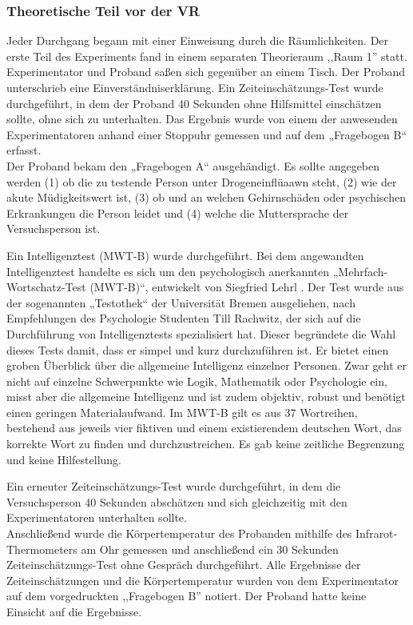 \documentclass{Paper}
\begin{document}
\subsubsection{Theoretische Teil vor der VR}
Jeder Durchgang begann mit einer Einweisung durch die Räumlichkeiten. Der erste Teil des
Experiments fand in einem separaten Theorieraum ,,Raum 1'' statt. Experimentator und
Proband saßen sich gegenüber an einem Tisch. Der Proband unterschrieb eine
Einverständniserklärung. Ein Zeiteinschätzungs-Test wurde durchgeführt, in dem der
Proband 40 Sekunden ohne Hilfsmittel einschätzen sollte, ohne sich zu unterhalten.
Das Ergebnis wurde von einem der anwesenden Experimentatoren anhand einer Stoppuhr
gemessen und auf dem „Fragebogen B“ erfasst. \\
Der Proband bekam den „Fragebogen A“ ausgehändigt. Es sollte angegeben werden (1) ob die zu testende Person unter
Drogeneinflüaawn steht, (2) wie der akute Müdigkeitswert ist, (3) ob und an welchen
Gehirnschäden oder psychischen Erkrankungen die Person leidet und (4) welche die
Muttersprache der Versuchsperson ist. 
\par
Ein Intelligenztest (MWT-B) wurde durchgeführt. Bei
dem angewandten Intelligenztest handelte es sich um den psychologisch anerkannten
„Mehrfach-Wortschatz-Test (MWT-B)“, entwickelt von Siegfried Lehrl \cite{MWT-B}. Der Test wurde aus
der sogenannten „Testothek“ der Universität Bremen ausgeliehen, nach Empfehlungen des
Psychologie Studenten Till Rachwitz, der sich auf die Durchführung von Intelligenztests
spezialisiert hat. Dieser begründete die Wahl dieses Tests damit, dass er simpel und kurz
durchzuführen ist. Er bietet einen groben Überblick über die allgemeine Intelligenz
einzelner Personen. Zwar geht er nicht auf einzelne Schwerpunkte wie Logik, Mathematik
oder Psychologie ein, misst aber die allgemeine Intelligenz und ist zudem objektiv, robust
und benötigt einen geringen Materialaufwand. Im MWT-B gilt es aus 37 Wortreihen,
bestehend aus jeweils vier fiktiven und einem existierendem deutschen Wort, das korrekte
Wort zu finden und durchzustreichen. Es gab
keine zeitliche Begrenzung und keine Hilfestellung.
\par
Ein erneuter Zeiteinschätzungs-Test wurde durchgeführt, in dem die Versuchsperson 40 Sekunden abschätzen und sich gleichzeitig mit den Experimentatoren unterhalten sollte. \\
Anschließend wurde die Körpertemperatur des Probanden mithilfe des Infrarot-Thermometers am Ohr gemessen und anschließend ein 30 Sekunden
Zeiteinschätzungs-Test ohne Gespräch durchgeführt. Alle Ergebnisse der Zeiteinschätzungen und die
Körpertemperatur wurden von dem Experimentator auf dem vorgedruckten ,,Fragebogen B''
notiert. Der Proband hatte keine Einsicht auf die Ergebnisse.
\end{document}
